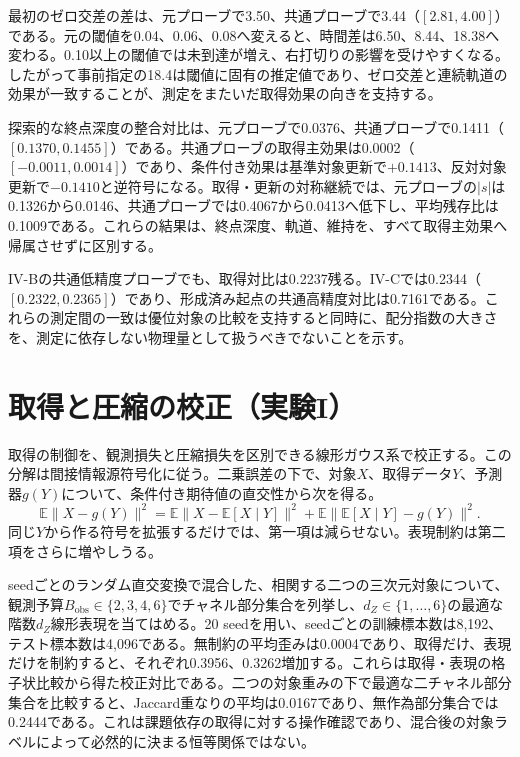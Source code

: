 最初のゼロ交差の差は、元プローブで3.50、共通プローブで3.44（$[2.81,4.00]$）である。元の閾値を0.04、0.06、0.08へ変えると、時間差は6.50、8.44、18.38へ変わる。0.10以上の閾値では未到達が増え、右打切りの影響を受けやすくなる。したがって事前指定の18.4は閾値に固有の推定値であり、ゼロ交差と連続軌道の効果が一致することが、測定をまたいだ取得効果の向きを支持する。

探索的な終点深度の整合対比は、元プローブで0.0376、共通プローブで0.1411（$[0.1370,0.1455]$）である。共通プローブの取得主効果は0.0002（$[-0.0011,0.0014]$）であり、条件付き効果は基準対象更新で$+0.1413$、反対対象更新で$-0.1410$と逆符号になる。取得・更新の対称継続では、元プローブの$|s|$は0.1326から0.0146、共通プローブでは0.4067から0.0413へ低下し、平均残存比は0.1009である。これらの結果は、終点深度、軌道、維持を、すべて取得主効果へ帰属させずに区別する。

IV-Bの共通低精度プローブでも、取得対比は0.2237残る。IV-Cでは0.2344（$[0.2322,0.2365]$）であり、形成済み起点の共通高精度対比は0.7161である。これらの測定間の一致は優位対象の比較を支持すると同時に、配分指数の大きさを、測定に依存しない物理量として扱うべきでないことを示す。


\section{取得と圧縮の校正（実験I）}
\label{app:calibration}
取得の制御を、観測損失と圧縮損失を区別できる線形ガウス系で校正する。この分解は間接情報源符号化に従う\citep{shannon1959coding,wolf1970transmission}。二乗誤差の下で、対象$X$、取得データ$Y$、予測器$g(Y)$について、条件付き期待値の直交性から次を得る。
\begin{equation}
\mathbb E\|X-g(Y)\|^2=\mathbb E\|X-\mathbb E[X\mid Y]\|^2+
\mathbb E\|\mathbb E[X\mid Y]-g(Y)\|^2.
\end{equation}
同じ$Y$から作る符号を拡張するだけでは、第一項は減らせない。表現制約は第二項をさらに増やしうる。

seedごとのランダム直交変換で混合した、相関する二つの三次元対象について、観測予算$B_{\mathrm{obs}}\in\{2,3,4,6\}$でチャネル部分集合を列挙し、$d_Z\in\{1,\ldots,6\}$の最適な階数$d_Z$線形表現を当てはめる。20 seedを用い、seedごとの訓練標本数は8,192、テスト標本数は4,096である。無制約の平均歪みは0.0004であり、取得だけ、表現だけを制約すると、それぞれ0.3956、0.3262増加する。これらは取得・表現の格子状比較から得た校正対比である。二つの対象重みの下で最適な二チャネル部分集合を比較すると、Jaccard重なりの平均は0.0167であり、無作為部分集合では0.2444である。これは課題依存の取得に対する操作確認であり、混合後の対象ラベルによって必然的に決まる恒等関係ではない。

